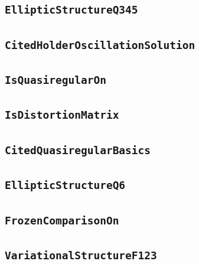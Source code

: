 \documentclass[11pt]{amsart}
\theoremstyle{definition}
\begin{document}
\subsection{\texorpdfstring{\texttt{EllipticStructureQ345}}{EllipticStructureQ345}}\label{node:EllipticStructureQ345}


\subsection{\texorpdfstring{\texttt{CitedHolderOscillationSolution}}{CitedHolderOscillationSolution}}\label{node:CitedHolderOscillationSolution}


\subsection{\texorpdfstring{\texttt{IsQuasiregularOn}}{IsQuasiregularOn}}\label{node:IsQuasiregularOn}


\subsection{\texorpdfstring{\texttt{IsDistortionMatrix}}{IsDistortionMatrix}}\label{node:IsDistortionMatrix}


\subsection{\texorpdfstring{\texttt{CitedQuasiregularBasics}}{CitedQuasiregularBasics}}\label{node:CitedQuasiregularBasics}


\subsection{\texorpdfstring{\texttt{EllipticStructureQ6}}{EllipticStructureQ6}}\label{node:EllipticStructureQ6}


\subsection{\texorpdfstring{\texttt{FrozenComparisonOn}}{FrozenComparisonOn}}\label{node:FrozenComparisonOn}


\subsection{\texorpdfstring{\texttt{VariationalStructureF123}}{VariationalStructureF123}}\label{node:VariationalStructureF123}

\end{document}
